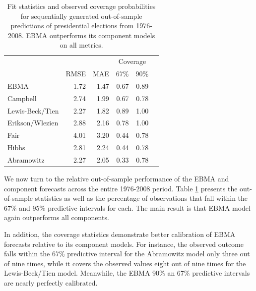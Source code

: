 \documentclass[pdftex,12pt,fullpage,oneside]{amsart}
\begin{document}
\begin{table}[ht!]
\vspace{-10pt}
  \caption{\footnotesize Fit statistics and observed coverage
    probabilities for sequentially generated out-of-sample predictions of
    presidential elections from 1976-2008.  EBMA outperforms its
    component models on all metrics.}
\label{Pres-Res} \small
\begin{center}
\begin{tabular}{lrrrrr}
\toprule
                        &              &              & \multicolumn{2}{c}{Coverage} \\ 
                    	&	RMSE&	MAE	&67\% &   90\%      \\
\midrule
EBMA	           &	1.72	&	1.47	&	0.67	&	0.89	\\
Campbell	           &	2.74	&	1.99	&	0.67	&	0.78	\\
Lewis-Beck/Tien&	2.27	&	1.82	&	0.89	&	1.00	\\
Erikson/Wlezien&	2.88	&	2.16	&	0.78	&	1.00	\\
Fair	                   &	4.01	&	3.20	&	0.44	&	0.78	\\
Hibbs	           &	2.81	&	2.24	&	0.44&      0.78 \\
Abramowitz	   &	2.27	&	2.05	&	0.33	&     0.78	\\

\bottomrule
\end{tabular}
\end{center}
\vspace{-10pt}
\end{table}

We now turn to the relative out-of-sample performance of the EBMA and
component forecasts across the entire 1976-2008 period.  Table
\ref{Pres-Res} presents the out-of-sample statistics as well as the
percentage of observations that fall within the 67\% and 95\%
predictive intervals for each.  The main result is that EBMA model
again outperforms all components.




 In addition, the coverage statistics demonstrate better calibration
 of EBMA forecasts relative to its component models.  For instance,
 the observed outcome falls within the 67\% predictive interval for
 the Abramowitz model only three out of nine times, while it covers the
 observed values eight out of nine times for the Lewis-Beck/Tien
 model.  Meanwhile, the EBMA 90\% an 67\% predictive intervals are
 nearly perfectly calibrated.
\end{document}
